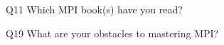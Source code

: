 \begin{description}%
\item{Q11} Which MPI book(s) have you read?%
\item{Q19} What are your obstacles to mastering MPI?%
\end{description}%
